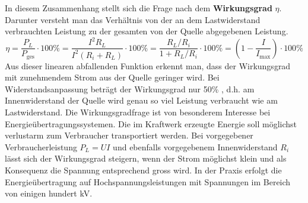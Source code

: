 \noindent In diesem Zusammenhang stellt sich die Frage nach dem \textbf{Wirkungsgrad} $\eta$. Darunter versteht man das Verhältnis von der an dem Lastwiderstand verbrauchten Leistung zu der gesamten von der Quelle abgegebenen Leistung.
\begin{equation}
\boxed{\eta=\dfrac{P_L}{P_{\text{ges}}}\cdot 100\%=\dfrac{I^2R_L}{I^2\left(R_i+R_L\right)}\cdot 100\%=\dfrac{R_L/R_i}{1+R_L/R_i}\cdot 100\%=\left(1-\dfrac{I}{I_{\text{max}}}\right)\cdot 100\%}
\end{equation}
Aus dieser linearen abfallenden Funktion erkennt man, dass der Wirkungsgrad mit zunehmendem Strom aus der Quelle geringer wird. Bei Widerstandsanpassung beträgt der Wirkungsgrad nur 50\% , d.h. am Innenwiderstand der Quelle wird genau so viel Leistung verbraucht wie am Lastwiderstand.
\newline\newline
Die Wirkungsgradfrage ist von besonderem Interesse bei Energieübertragungssystemen. Die im Kraftwerk erzeugte Energie soll möglichst verlustarm zum Verbraucher transportiert werden. Bei vorgegebener Verbraucherleistung $P_L=UI$ und ebenfalls vorgegebenem Innenwiderstand $R_i$ lässt sich der Wirkungsgrad steigern, wenn der Strom möglichst klein und als Konsequenz die Spannung entsprechend gross wird. In der Praxis erfolgt die Energieübertragung auf Hochspannungsleistungen mit Spannungen im Bereich von einigen hundert kV.
